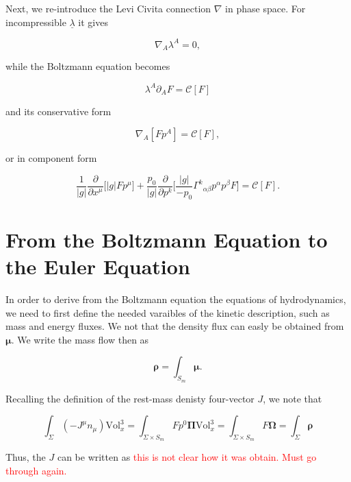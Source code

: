 Next, we re-introduce the Levi Civita connection $\nabla$ in phase space. For incompressible $\underline{\lambda}$ it gives

\begin{equation}
\nabla_A\lambda^A=0,
\end{equation}

while the Boltzmann equation becomes 

\begin{equation}
\lambda^A\partial_A F=\mathcal{C}[F]
\end{equation}

and its conservative form 

\begin{equation}
\nabla_A[Fp^{A}] = \mathcal{C}[F],
\label{eq:theory:liouvilletheorem}
\end{equation}

or in component form

\begin{equation}
\frac{1}{|g|}\frac{\partial}{\partial x^{\mu}}\Bigg[|g|Fp^{\mu}\Bigg] + \frac{p_0}{|g|}\frac{\partial}{\partial p^{k}}\Bigg[\frac{|g|}{-p_0}{\Gamma^k}_{\alpha\beta}p^{\alpha}p^{\beta}F\Bigg] = \mathcal{C}[F].
\end{equation}


\section{From the Boltzmann Equation to the Euler Equation}


In order to derive from the Boltzmann equation the equations of hydrodynamics, we need to first define the needed varaibles of the kinetic description, such as mass and energy fluxes. We not that the density flux can easly be obtained from $\boldsymbol{\mu}$. We write the mass flow then as 

\begin{equation}
\boldsymbol{\rho} = \int_{S_m} \boldsymbol{\mu}.
\end{equation}

Recalling the definition of the rest-mass denisty four-vector $J$, we note that

\begin{equation}
\int_{\Sigma}(-J^{\mu}n_{\mu})\text{Vol}_x ^3 = \int_{\Sigma\times S_{m}} Fp^0\boldsymbol{\Pi}\text{Vol}_x ^3 = \int_{\Sigma\times S_{m}} F\boldsymbol{\Omega} = \int_{\Sigma}\boldsymbol{\rho}
\end{equation}

Thus, the $J$ can be written as 
\textcolor{red}{this is not clear how it was obtain. Must go through again.}

